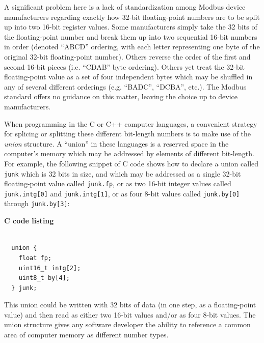 A significant problem here is a lack of standardization among Modbus device manufacturers regarding exactly how 32-bit floating-point numbers are to be split up into two 16-bit register values.  Some manufacturers simply take the 32 bits of the floating-point number and break them up into two sequential 16-bit numbers in order (denoted ``ABCD'' ordering, with each letter representing one byte of the original 32-bit floating-point number).  Others reverse the order of the first and second 16-bit pieces (i.e. ``CDAB'' byte ordering).  Others yet treat the 32-bit floating-point value as a set of four independent bytes which may be shuffled in any of several different orderings (e.g. ``BADC'', ``DCBA'', etc.).  The Modbus standard offers no guidance on this matter, leaving the choice up to device manufacturers.

\vskip 10pt

When programming in the C or C++ computer languages, a convenient strategy for splicing or splitting these different bit-length numbers is to make use of the \textit{union} structure.  A ``union'' in these languages is a reserved space in the computer's memory which may be addressed by elements of different bit-length.  For example, the following snippet of C code shows how to declare a union called \texttt{junk} which is 32 bits in size, and which may be addressed as a single 32-bit floating-point value called \texttt{junk.fp}, or as two 16-bit integer values called \texttt{junk.intg[0]} and \texttt{junk.intg[1]}, or as four 8-bit values called \texttt{junk.by[0]} through \texttt{junk.by[3]}:

\vskip 10pt

\textbf{C code listing} 

\lstset{language=C}
\begin{lstlisting}

  union {
    float fp;
    uint16_t intg[2];
    uint8_t by[4];
  } junk;

\end{lstlisting}

\vskip 10pt

This union could be written with 32 bits of data (in one step, as a floating-point value) and then read as either two 16-bit values and/or as four 8-bit values.  The union structure gives any software developer the ability to reference a common area of computer memory as different number types.

\vskip 10pt

\filbreak


